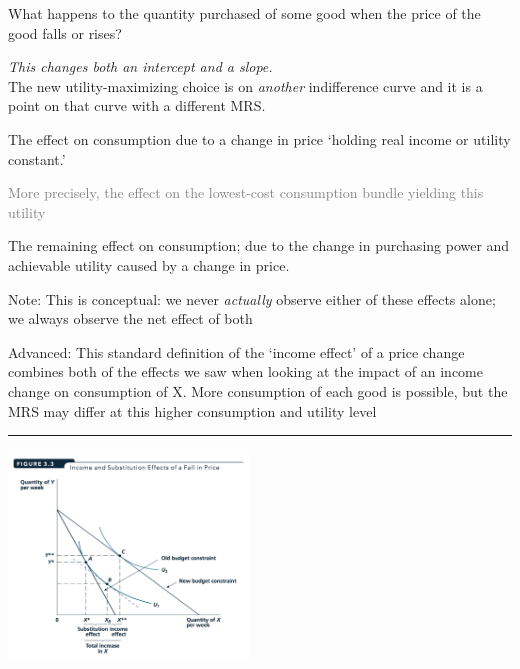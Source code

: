 \documentclass[]{article}
\providecommand{\tightlist}{%
  \setlength{\itemsep}{0pt}\setlength{\parskip}{0pt}}
\begin{document}
What happens to the quantity purchased of some good when the price of the good falls or rises?

\emph{This changes both an intercept and a slope.}\\

The new utility-maximizing choice is on \emph{another} indifference curve and it is a point on that curve with a different MRS.

\begin{description}
\tightlist
\item[Substitution effect (`Hicksian')]
The effect on consumption due to a change in price `holding real income or utility constant.'
\end{description}

\textcolor{gray}{More precisely, the effect on the lowest-cost consumption bundle yielding this utility}

\begin{description}
\tightlist
\item[Income effect (of a price change)]
The remaining effect on consumption; due to the change in purchasing power and achievable utility caused by a change in price.
\end{description}

Note: This is conceptual: we never \emph{actually} observe either of these effects alone; we always observe the net effect of both

Advanced: This standard definition of the `income effect' of a price change
combines both of the effects we saw when looking at the impact of an income change on consumption of X.
More consumption of each good is possible, but the MRS may differ at this higher consumption and utility level

\begin{center}\rule{0.5\linewidth}{\linethickness}\end{center}

\includegraphics[height=2.2in]{picsfigs/incomeandsubstfx.png}
\end{document}

